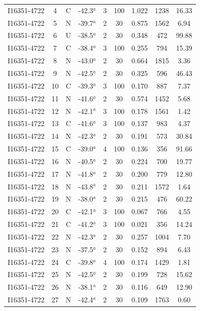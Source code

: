 \begin{table}
\begin{tabular}{ccccccccc}
I16351-4722 & 4 & C & -42.3$^{a}$ & 3 & 100 & 1.022 & 1238 & 16.33 \\
I16351-4722 & 5 & N & -39.7$^{a}$ & 2 & 30 & 0.875 & 1562 & 6.94 \\
I16351-4722 & 6 & U & -38.5$^{a}$ & 2 & 30 & 0.348 & 472 & 99.88 \\
I16351-4722 & 7 & C & -38.4$^{a}$ & 3 & 100 & 0.255 & 794 & 15.39 \\
I16351-4722 & 8 & N & -43.0$^{a}$ & 2 & 30 & 0.664 & 1815 & 3.36 \\
I16351-4722 & 9 & N & -42.5$^{a}$ & 2 & 30 & 0.325 & 596 & 46.43 \\
I16351-4722 & 10 & C & -39.3$^{a}$ & 3 & 100 & 0.170 & 887 & 7.37 \\
I16351-4722 & 11 & N & -41.6$^{a}$ & 2 & 30 & 0.574 & 1452 & 5.68 \\
I16351-4722 & 12 & N & -42.1$^{a}$ & 3 & 100 & 0.178 & 1561 & 1.42 \\
I16351-4722 & 13 & C & -41.6$^{a}$ & 3 & 100 & 0.137 & 983 & 4.37 \\
I16351-4722 & 14 & N & -42.3$^{a}$ & 2 & 30 & 0.191 & 573 & 30.84 \\
I16351-4722 & 15 & C & -39.0$^{a}$ & 4 & 100 & 0.136 & 356 & 91.66 \\
I16351-4722 & 16 & N & -40.5$^{a}$ & 2 & 30 & 0.224 & 700 & 19.77 \\
I16351-4722 & 17 & N & -41.8$^{a}$ & 2 & 30 & 0.200 & 779 & 12.80 \\
I16351-4722 & 18 & N & -43.8$^{a}$ & 2 & 30 & 0.211 & 1572 & 1.64 \\
I16351-4722 & 19 & N & -38.0$^{a}$ & 2 & 30 & 0.215 & 476 & 60.22 \\
I16351-4722 & 20 & C & -42.1$^{a}$ & 3 & 100 & 0.067 & 766 & 4.55 \\
I16351-4722 & 21 & C & -41.2$^{a}$ & 3 & 100 & 0.021 & 356 & 14.24 \\
I16351-4722 & 22 & N & -42.3$^{a}$ & 2 & 30 & 0.257 & 1004 & 7.70 \\
I16351-4722 & 23 & N & -37.5$^{a}$ & 2 & 30 & 0.152 & 894 & 6.43 \\
I16351-4722 & 24 & C & -39.8$^{a}$ & 4 & 100 & 0.174 & 1429 & 1.81 \\
I16351-4722 & 25 & N & -42.5$^{a}$ & 2 & 30 & 0.199 & 728 & 15.62 \\
I16351-4722 & 26 & N & -38.1$^{a}$ & 2 & 30 & 0.116 & 649 & 12.90 \\
I16351-4722 & 27 & N & -42.4$^{a}$ & 2 & 30 & 0.109 & 1763 & 0.60 \\

\end{tabular}
\end{table}
